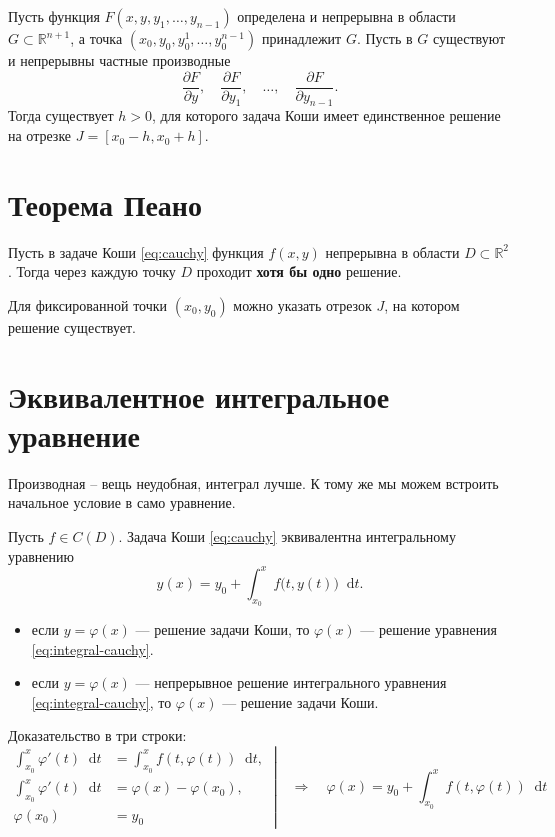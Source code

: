 \documentclass[12pt,a4paper]{article}
\numberwithin{equation}{section}
\newcommand{\R}{\mathbb{R}}
\newcommand{\dd}{\mathop{}\!\mathrm{d}}
\begin{document}
\begin{theoremHSE}
Пусть функция \(F(x,y,y_1,\ldots,y_{n-1})\) определена и непрерывна в
области \(G\subset\R^{n+1}\), а точка
\((x_0,y_0,y_0^1,\ldots,y_0^{n-1})\) принадлежит \(G\).
Пусть в \(G\) существуют и непрерывны частные производные
\[
 \frac{\partial F}{\partial y},\quad \frac{\partial F}{\partial y_1},
 \quad\ldots,\quad \frac{\partial F}{\partial y_{n-1}}.
\]
Тогда существует \(h>0\), для которого задача Коши имеет единственное
решение на отрезке \(J=[x_0-h,x_0+h]\).
\end{theoremHSE}

\section{Теорема Пеано}

\begin{theoremHSE}[Пеано]
Пусть в задаче Коши \eqref{eq:cauchy} функция $f(x,y)$ непрерывна в области $D\subset\mathbb{R}^2$. Тогда через каждую точку $D$ проходит \textbf{хотя бы одно} решение. 

Для фиксированной точки $(x_0,y_0)$ можно указать отрезок $J$, на котором решение существует.
\end{theoremHSE}

\section{Эквивалентное интегральное уравнение}

Производная -- вещь неудобная, интеграл лучше. К тому же мы можем встроить начальное условие в само уравнение.

\begin{theoremHSE}
Пусть $f\in C(D)$. Задача Коши \eqref{eq:cauchy} эквивалентна интегральному уравнению
\begin{equation}
 y(x)=y_0+\int_{x_0}^{x} f\bigl(t,y(t)\bigr)\dd t.
 \label{eq:integral-cauchy}
\end{equation}
\begin{itemize}
\item если \(y=\varphi(x)\) --- решение задачи Коши, то \(\varphi(x)\) --- решение уравнения \eqref{eq:integral-cauchy}.
\item если \(y=\varphi(x)\) --- непрерывное решение интегрального уравнения \eqref{eq:integral-cauchy}, то \(\varphi(x)\) --- решение задачи Коши.
\end{itemize}
\end{theoremHSE}
Доказательство в три строки:
\[
\left.
\begin{aligned}
\int_{x_0}^{x}\varphi'(t)\dd t
    &= \int_{x_0}^{x}f(t,\varphi(t))\dd t,\\
\int_{x_0}^{x}\varphi'(t)\dd t
    &= \varphi(x)-\varphi(x_0),\\
\varphi(x_0) &= y_0
\end{aligned}\
\right|
\quad\Longrightarrow\quad
\varphi(x)=y_0+\int_{x_0}^{x}f(t,\varphi(t))\dd t
\]
\end{document}
